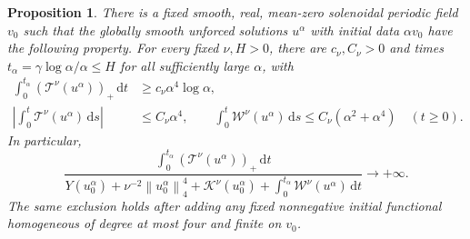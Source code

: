 \documentclass[11pt]{article}
\newtheorem{proposition}{Proposition}
\newcommand{\dd}{\,\mathrm d}
\newcommand{\norm}[1]{\left\lVert#1\right\rVert}
\begin{document}
\begin{proposition}\label{prop:recurrentcaloric}
There is a fixed smooth, real, mean-zero solenoidal periodic field $v_0$
such that the globally smooth unforced solutions $u^\alpha$ with initial
data $\alpha v_0$ have the following property. For every fixed $\nu,H>0$,
there are $c_\nu,C_\nu>0$ and times
$t_\alpha=\gamma\log\alpha/\alpha\leq H$ for all sufficiently large
$\alpha$, with
\begin{align}
 \int_0^{t_\alpha}(\mathcal T^\nu(u^\alpha))_+\dd t
     &\geq c_\nu\alpha^4\log\alpha,\label{eq:cyclepositive}\\
 \left|\int_0^t\mathcal T^\nu(u^\alpha)\dd s\right|
     &\leq C_\nu\alpha^4,\qquad
 \int_0^t\mathcal W^\nu(u^\alpha)\dd s
       \leq C_\nu(\alpha^2+\alpha^4) \quad(t\geq0).
       \label{eq:cyclesigned}
\end{align}
In particular,
\[
 \frac{\displaystyle\int_0^{t_\alpha}(\mathcal T^\nu(u^\alpha))_+\dd t}
 {\displaystyle Y(u^\alpha_0)+\nu^{-2}\norm{u^\alpha_0}_4^4
       +\mathcal K^\nu(u^\alpha_0)
       +\int_0^{t_\alpha}\mathcal W^\nu(u^\alpha)\dd t}
       \longrightarrow+\infty.
\]
The same exclusion holds after adding any fixed nonnegative initial functional
homogeneous of degree at most four and finite on $v_0$.
\end{proposition}
\end{document}
